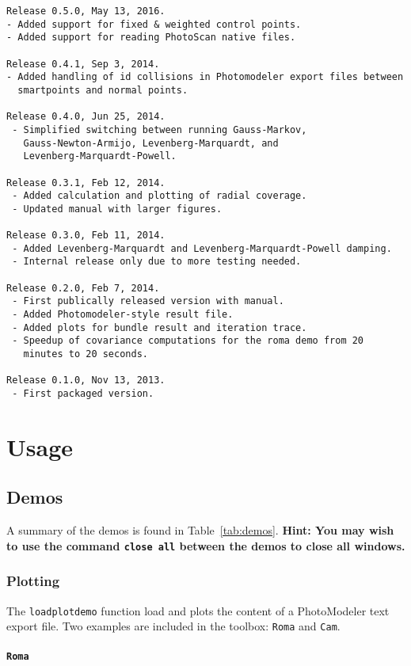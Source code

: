 \documentclass{article}
\begin{document}
\begin{verbatim}
Release 0.5.0, May 13, 2016.
- Added support for fixed & weighted control points.
- Added support for reading PhotoScan native files.

Release 0.4.1, Sep 3, 2014.
- Added handling of id collisions in Photomodeler export files between 
  smartpoints and normal points.

Release 0.4.0, Jun 25, 2014.
 - Simplified switching between running Gauss-Markov,
   Gauss-Newton-Armijo, Levenberg-Marquardt, and
   Levenberg-Marquardt-Powell.

Release 0.3.1, Feb 12, 2014.
 - Added calculation and plotting of radial coverage.
 - Updated manual with larger figures.

Release 0.3.0, Feb 11, 2014.
 - Added Levenberg-Marquardt and Levenberg-Marquardt-Powell damping.
 - Internal release only due to more testing needed.

Release 0.2.0, Feb 7, 2014.
 - First publically released version with manual.
 - Added Photomodeler-style result file.
 - Added plots for bundle result and iteration trace.
 - Speedup of covariance computations for the roma demo from 20
   minutes to 20 seconds.

Release 0.1.0, Nov 13, 2013.
 - First packaged version.
\end{verbatim}

\newpage
\section{Usage}
\label{sec:org566486d}
\subsection{Demos}
\label{sec:demos}
A summary of the demos is found in Table~\ref{tab:demos}.
\textbf{Hint: You may wish to use the command \texttt{close all} between the demos to close
all windows.}

\subsubsection{Plotting}
\label{sec:loadplotdemo}
The \texttt{loadplotdemo} function load and plots the content of a
PhotoModeler text export file. Two examples are included in the
toolbox: \texttt{Roma} and \texttt{Cam}.

\paragraph{\texttt{Roma}}
\label{sec:orga2931bc}
\end{document}
